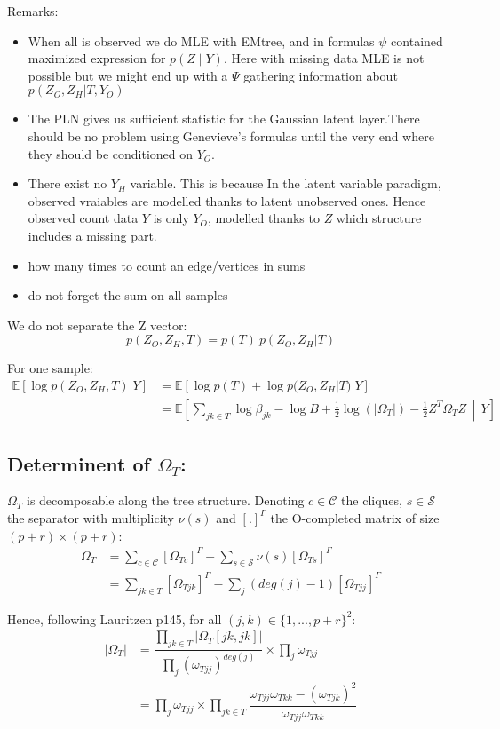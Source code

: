 \documentclass[11pt,a4paper]{article}
\newcommand{\Esp}{\mathds{E}}
\begin{document}
Remarks:
\begin{itemize}
\item When all is observed we do MLE with EMtree, and in formulas $\psi$ contained maximized expression for $p(Z \mid Y)$. Here with missing data MLE is not possible but we might end up with a $\Psi$ gathering information about $ p(Z_O,Z_H|T,Y_O)$
\item The PLN gives us sufficient statistic for the Gaussian latent layer.There should be no problem using Genevieve's formulas until the very end where they should be conditioned on $Y_O$.
\item There exist no $Y_H$ variable. This is because In the latent variable paradigm, observed vraiables are modelled thanks to latent unobserved ones. Hence observed count data $Y$ is only $Y_O$, modelled thanks to $Z$ which structure includes a  missing part.
\item how many times to count an edge/vertices in sums 
\item do not forget the sum on all samples
\end{itemize}



We do not separate the Z vector:
$$p(Z_O,Z_H,T) = p(T) \: p(Z_O,Z_H|T)$$

For one sample:
\begin{align*}
 \Esp[\log p(Z_O,Z_H,T) | Y ] &=  \Esp[\log p(T)+\log p(Z_O,Z_H|T)|Y] \\
  &=\Esp\left[\sum_{jk \in T} \log \beta_{jk} - \log B + \frac{1}{2} \log(|\Omega_T|) - \frac{1}{2} Z^T \Omega_T Z\,\middle\vert\,  Y\right]
\end{align*} 


\subsection{Determinent of $\Omega_T$:\\}
$\Omega_T$ is decomposable along the tree structure. Denoting $c\in\mathcal{C}$ the cliques, $s\in \mathcal{S}$ the separator with multiplicity $\nu(s)$ and $[.]^\Gamma$ the O-completed matrix of size $(p+r)\times(p+r)$:
\begin{align*}
\Omega_T &= \sum_{c\in \mathcal{C}} [\Omega_{Tc}]^\Gamma - \sum_{s \in\mathcal{S}} \nu(s)[\Omega_{Ts}]^\Gamma\\
&= \sum_{jk \in T} [\Omega_{Tjk}]^\Gamma - \sum_j (deg(j)-1)[\Omega_{Tjj}]^\Gamma
\end{align*}

Hence, following Lauritzen p145, for all $(j,k) \in \{1,...,p+r\}^2$:
\begin{align*}
|\Omega_T| &= \dfrac{\prod_{jk \in T} |\Omega_T[jk,jk]|}{\prod_j (\omega_{Tjj})^{deg(j)}} \times \prod_j \omega_{Tjj}\\
&=\prod_j \omega_{Tjj} \times \prod_{jk \in T} \dfrac{\omega_{Tjj}\omega_{Tkk}-(\omega_{Tjk})^2}{\omega_{Tjj}\omega_{Tkk}}
\end{align*}
\end{document}
